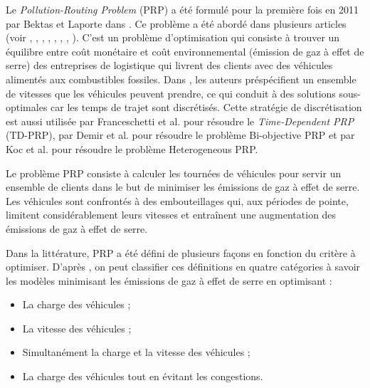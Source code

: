 Le \textit{Pollution-Routing Problem} (PRP) a été formulé pour la première fois en 2011 par Bektas et Laporte dans \cite{BEKTAS20111232}. Ce problème a été abordé dans plusieurs articles (voir \cite{article_GVRP7}, \cite{article_GVRP6}, \cite{article_GVRP8}, \cite{PRP_Franceschetti_2013}, \cite{PRP_Ko_2014}, \cite{PRP_Rui_2020}, \cite{PRP_Erfan_2020}, \cite{PRP_Yiyong_2020}). C'est un problème d'optimisation qui consiste à trouver un équilibre entre coût
monétaire et coût environnemental (émission de gaz à effet de serre) des entreprises de logistique qui livrent des clients avec des véhicules alimentés aux combustibles fossiles. Dans \cite{BEKTAS20111232}, les auteurs préspécifient un ensemble de vitesses que les véhicules peuvent prendre, ce qui conduit à des solutions sous-optimales car les temps de trajet sont discrétisés. Cette stratégie de discrétisation est aussi utilisée par Franceschetti et al. \cite{PRP_Franceschetti_2013} pour résoudre le \textit{Time-Dependent PRP} (TD-PRP), par Demir et al. \cite{article_GVRP6} pour résoudre le problème Bi-objective PRP et par Koc et al. \cite{PRP_Ko_2014} pour résoudre le problème Heterogeneous PRP.

Le problème PRP consiste à calculer les tournées de véhicules pour servir un ensemble de clients dans le but de minimiser les émissions de gaz à effet de serre. Les véhicules sont confrontés à des embouteillages
qui, aux périodes de pointe, limitent considérablement leurs vitesses et entraînent une augmentation des émissions de gaz à effet de serre.

Dans la littérature, PRP a été défini de plusieurs façons en fonction du critère à optimiser. D'après \cite{BEKTAS20111232}, on peut classifier ces définitions en quatre catégories à savoir les modèles minimisant les émissions de gaz à effet de serre en optimisant :
\begin{itemize}[label=$\square$]
	\item La charge des véhicules ;
	\item La vitesse des véhicules ;
	\item Simultanément la charge et la vitesse des véhicules ;
	\item La charge des véhicules tout en évitant les congestions.
\end{itemize}

